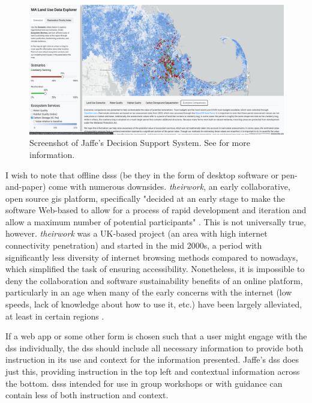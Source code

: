 \begin{figure}[!htb]
	\centering
	\includegraphics[scale=0.2]{Figures/chap3/jaffe_application.png}
	\caption[Screenshot of Jaffe's Decision Support System] {Screenshot of Jaffe's Decision Support System. See \cite{jaffeEnvironmentalEconomicSystems2022} for more information.}
	\label{fig:jaffe_application}
\end{figure}

I wish to note that offline \acp{dss} (be they in the form of desktop software or pen-and-paper) come with numerous downsides. \textit{theirwork}, an early collaborative, open source \ac{gis} platform, specifically "decided at an early stage to make the software Web-based to allow for a process of rapid development and iteration and allow a maximum number of potential participants" \cite{williamsonTheirworkDevelopmentSustainable2011}. This is not universally true, however. \textit{theirwork} was a UK-based project (an area with high internet connectivity penetration) and started in the mid 2000s, a period with significantly less diversity of internet browsing methods compared to nowadays, which simplified the task of ensuring accessibility. Nonetheless, it is impossible to deny the collaboration and software sustainability benefits of an online platform, particularly in an age when many of the early concerns with the internet (low speeds, lack of knowledge about how to use it, etc.) have been largely alleviated, at least in certain regions \cite{shifterInteractiveMultimediaPlanning1995}.

If a web app or some other form is chosen such that a user might engage with the \ac{dss} individually, the \ac{dss} should include all necessary information to provide both instruction in its use and context for the information presented. Jaffe's \ac{dss} does just this, providing instruction in the top left and contextual information across the bottom. \acp{dss} intended for use in group workshops or with guidance can contain less of both instruction and context.

